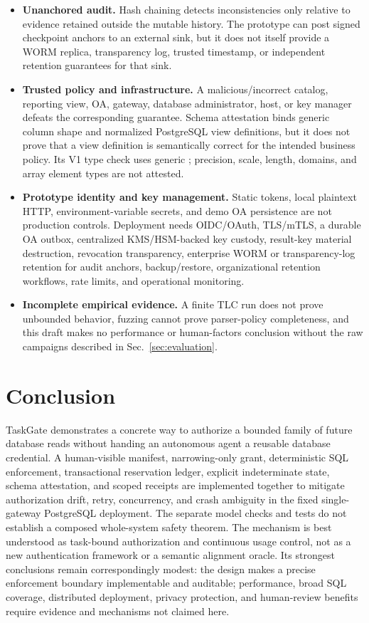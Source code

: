 \documentclass[10pt,journal,compsoc]{IEEEtran}
\newcommand{\system}{TaskGate\xspace}
\newcommand{\code}[1]{\texttt{\detokenize{#1}}}
\begin{document}
\begin{itemize}
  independent execution witness.
  \item \textbf{Unanchored audit.}  Hash chaining detects inconsistencies only
  relative to evidence retained outside the mutable history.  The prototype can
  post signed checkpoint anchors to an external sink, but it does not itself
  provide a WORM replica, transparency log, trusted timestamp, or independent
  retention guarantees for that sink.
  \item \textbf{Trusted policy and infrastructure.}  A malicious/incorrect
  catalog, reporting view, OA, gateway, database administrator, host, or key
  manager defeats the corresponding guarantee.  Schema attestation binds generic
  column shape and normalized PostgreSQL view definitions, but it does not prove
  that a view definition is semantically correct for the intended business
  policy.  Its V1 type check uses generic
  \code{information\_schema.data\_type}; precision, scale, length, domains, and
  array element types are not attested.
  \item \textbf{Prototype identity and key management.}  Static tokens, local
  plaintext HTTP, environment-variable secrets, and demo OA persistence are not
  production controls.  Deployment needs OIDC/OAuth, TLS/mTLS, a durable OA
  outbox, centralized KMS/HSM-backed key custody, result-key material
  destruction, revocation transparency, enterprise WORM or transparency-log
  retention for audit anchors,
  backup/restore, organizational retention workflows, rate limits, and
  operational monitoring.
  \item \textbf{Incomplete empirical evidence.}  A finite TLC run does not
  prove unbounded behavior, fuzzing cannot prove parser-policy completeness, and
  this draft makes no performance or human-factors conclusion without the raw
  campaigns described in Sec.~\ref{sec:evaluation}.
\end{itemize}

\section{Conclusion}
\label{sec:conclusion}

\system demonstrates a concrete way to authorize a bounded family of future
database reads without handing an autonomous agent a reusable database
credential.  A human-visible manifest, narrowing-only grant, deterministic SQL
enforcement, transactional reservation ledger, explicit indeterminate state,
schema attestation, and scoped receipts are implemented together to mitigate
authorization drift, retry, concurrency, and crash ambiguity in the fixed
single-gateway PostgreSQL deployment.  The separate model checks and tests do
not establish a composed whole-system safety theorem.  The mechanism is best
understood as task-bound authorization and
continuous usage control, not as a new authentication framework or a semantic
alignment oracle.  Its strongest conclusions remain correspondingly modest:
the design makes a precise enforcement boundary implementable and auditable;
performance, broad SQL coverage, distributed deployment, privacy protection,
and human-review benefits require evidence and mechanisms not claimed here.


\end{document}
